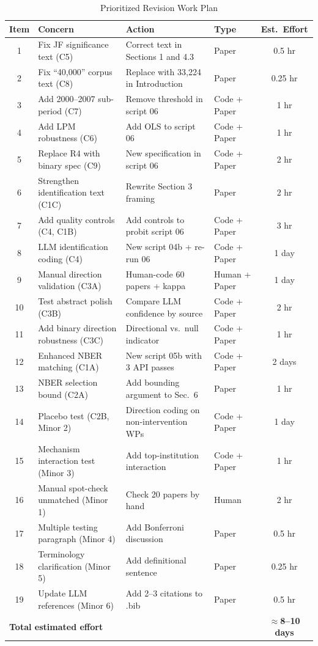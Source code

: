 \documentclass[12pt]{article}
\begin{document}
\begin{table}[h]
\centering
\caption{Prioritized Revision Work Plan}
\label{tab:workplan}
\small
\begin{tabular}{clllc}
\toprule
Item & Concern & Action & Type & Est.\ Effort \\
\midrule
1 & Fix JF significance text (C5) & Correct text in Sections 1 and 4.3 & Paper & 0.5 hr \\
2 & Fix ``40,000'' corpus text (C8) & Replace with 33,224 in Introduction & Paper & 0.25 hr \\
3 & Add 2000--2007 sub-period (C7) & Remove threshold in script 06 & Code + Paper & 1 hr \\
4 & Add LPM robustness (C6) & Add OLS to script 06 & Code + Paper & 1 hr \\
5 & Replace R4 with binary spec (C9) & New specification in script 06 & Code + Paper & 2 hr \\
6 & Strengthen identification text (C1C) & Rewrite Section 3 framing & Paper & 2 hr \\
7 & Add quality controls (C4, C1B) & Add controls to probit script 06 & Code + Paper & 3 hr \\
8 & LLM identification coding (C4) & New script 04b + re-run 06 & Code + Paper & 1 day \\
9 & Manual direction validation (C3A) & Human-code 60 papers + kappa & Human + Paper & 1 day \\
10 & Test abstract polish (C3B) & Compare LLM confidence by source & Code + Paper & 2 hr \\
11 & Add binary direction robustness (C3C) & Directional vs.\ null indicator & Code + Paper & 1 hr \\
12 & Enhanced NBER matching (C1A) & New script 05b with 3 API passes & Code + Paper & 2 days \\
13 & NBER selection bound (C2A) & Add bounding argument to Sec.\ 6 & Paper & 1 hr \\
14 & Placebo test (C2B, Minor 2) & Direction coding on non-intervention WPs & Code + Paper & 1 day \\
15 & Mechanism interaction test (Minor 3) & Add top-institution interaction & Code + Paper & 1 hr \\
16 & Manual spot-check unmatched (Minor 1) & Check 20 papers by hand & Human & 2 hr \\
17 & Multiple testing paragraph (Minor 4) & Add Bonferroni discussion & Paper & 0.5 hr \\
18 & Terminology clarification (Minor 5) & Add definitional sentence & Paper & 0.25 hr \\
19 & Update LLM references (Minor 6) & Add 2--3 citations to .bib & Paper & 0.5 hr \\
\midrule
\multicolumn{4}{l}{\textbf{Total estimated effort}} & $\approx$\textbf{8--10 days} \\
\bottomrule
\end{tabular}
\end{table}
\end{document}
